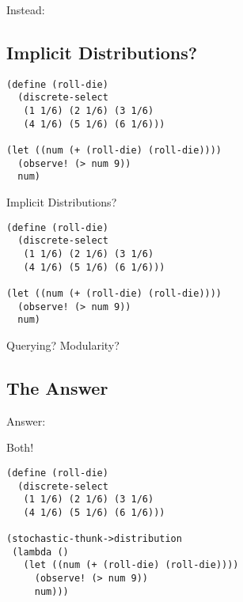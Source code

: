 \documentclass{beamer}
\begin{document}
\begin{frame}
\begin{center}
\Huge Instead:
\end{center}
\end{frame}

\subsection{Implicit Distributions?}

\begin{frame}[fragile=singleslide]
\begin{verbatim}
(define (roll-die)
  (discrete-select
   (1 1/6) (2 1/6) (3 1/6)
   (4 1/6) (5 1/6) (6 1/6)))

(let ((num (+ (roll-die) (roll-die))))
  (observe! (> num 9))
  num)
\end{verbatim}
\begin{center}
\Huge Implicit Distributions?
\end{center}
\end{frame}

\begin{frame}[fragile=singleslide]
\begin{verbatim}
(define (roll-die)
  (discrete-select
   (1 1/6) (2 1/6) (3 1/6)
   (4 1/6) (5 1/6) (6 1/6)))

(let ((num (+ (roll-die) (roll-die))))
  (observe! (> num 9))
  num)
\end{verbatim}
\begin{center}
\Huge Querying?  Modularity?
\end{center}
\end{frame}

\subsection{The Answer}

\begin{frame}
\begin{center}
\Huge Answer:
\end{center}
\end{frame}

\begin{frame}
\begin{center}
\Huge Both!
\end{center}
\end{frame}

\begin{frame}[fragile=singleslide]
\begin{verbatim}
(define (roll-die)
  (discrete-select
   (1 1/6) (2 1/6) (3 1/6)
   (4 1/6) (5 1/6) (6 1/6)))

(stochastic-thunk->distribution
 (lambda ()
   (let ((num (+ (roll-die) (roll-die))))
     (observe! (> num 9))
     num)))
\end{verbatim}
\end{frame}
\end{document}
